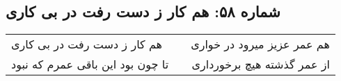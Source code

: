 \begin{center}
\section*{شماره ۵۸: هم کار ز دست رفت در بی کاری}
\label{sec:058}
\begin{longtable}{l p{0.5cm} r}
هم کار ز دست رفت در بی کاری
&&
هم عمر عزیز میرود در خواری
\\
تا چون بود این باقی عمرم که نبود
&&
از عمر گذشته هیچ برخورداری
\\
\end{longtable}
\end{center}

